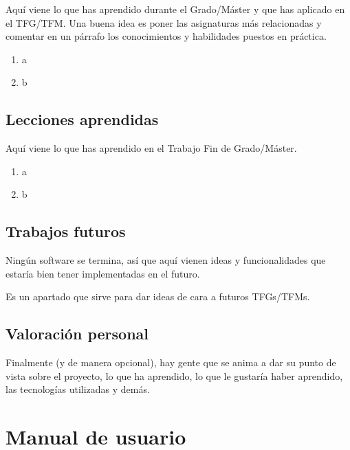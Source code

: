 \documentclass[a4paper, 12pt]{book}
\begin{document}
Aquí viene lo que has aprendido durante el Grado/Máster y que has aplicado
en el TFG/TFM. Una buena idea es poner las asignaturas más relacionadas y
comentar en un párrafo los conocimientos y habilidades puestos en práctica.

\begin{enumerate}
  \item a
  \item b
\end{enumerate}


\section{Lecciones aprendidas}
\label{sec:lecciones_aprendidas}

Aquí viene lo que has aprendido en el Trabajo Fin de Grado/Máster.

\begin{enumerate}
  \item a
  \item b
\end{enumerate}


\section{Trabajos futuros}
\label{sec:trabajos_futuros}

Ningún software se termina, así que aquí vienen ideas y funcionalidades
que estaría bien tener implementadas en el futuro.

Es un apartado que sirve para dar ideas de cara a futuros TFGs/TFMs.


\section{Valoración personal}
\label{sec:valoracion}

Finalmente (y de manera opcional), hay gente que se anima a dar su punto de
vista sobre el proyecto, lo que ha aprendido, lo que le gustaría haber aprendido,
las tecnologías utilizadas y demás.




\cleardoublepage
\appendix
\chapter{Manual de usuario}
\label{app:manual}
\end{document}
